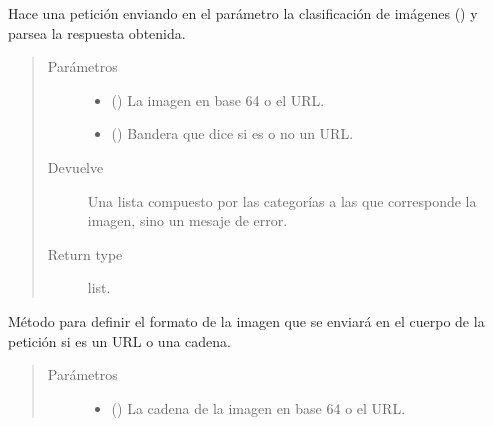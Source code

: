 \begin{fulllineitems}
\begin{fulllineitems}
\label{\detokenize{chapter_two/desc_cloudnao:app.tpa_client_libraries.google_cloud_vision.GoogleCloudVision.label_annotations_description}}
Hace una petición enviando en el parámetro  la clasificación
de imágenes () y parsea la respuesta obtenida.
\begin{quote}\begin{description}
\item[{Parámetros}] \leavevmode\begin{itemize}
\item {} 
 () \textendash{} La imagen en base 64 o el URL.

\item {} 
 () \textendash{} Bandera que dice si es o no un URL.

\end{itemize}

\item[{Devuelve}] \leavevmode
Una lista compuesto por las categorías a las que corresponde la imagen, sino un mesaje de error.

\item[{Return type}] \leavevmode
list.

\end{description}\end{quote}

\end{fulllineitems}


\begin{fulllineitems}
\label{\detokenize{chapter_two/desc_cloudnao:app.tpa_client_libraries.google_cloud_vision.GoogleCloudVision.set_data}}
Método para definir el formato de la imagen que se enviará en el
cuerpo de la petición si es un URL o una cadena.
\begin{quote}\begin{description}
\item[{Parámetros}] \leavevmode\begin{itemize}
\item {} 
 () \textendash{} La cadena de la imagen en base 64 o el URL.


\end{itemize}
\end{description}
\end{quote}
\end{fulllineitems}
\end{fulllineitems}
